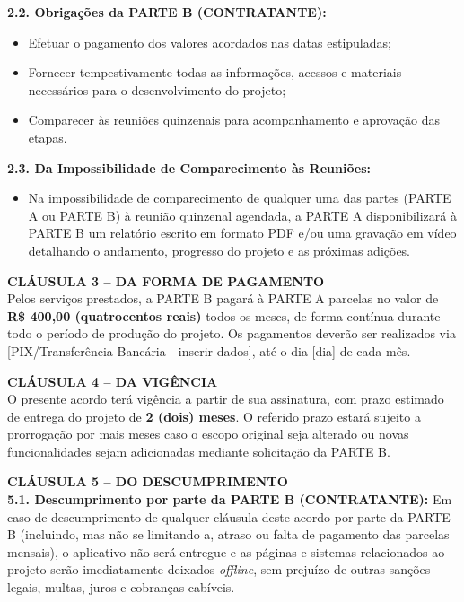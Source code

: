 \documentclass[12pt, a4paper]{article}
\begin{document}
\textbf{2.2. Obrigações da PARTE B (CONTRATANTE):}
\begin{itemize}
    \item Efetuar o pagamento dos valores acordados nas datas estipuladas;
    \item Fornecer tempestivamente todas as informações, acessos e materiais necessários para o desenvolvimento do projeto;
    \item Comparecer às reuniões quinzenais para acompanhamento e aprovação das etapas.
\end{itemize}

\textbf{2.3. Da Impossibilidade de Comparecimento às Reuniões:}
\begin{itemize}
    \item Na impossibilidade de comparecimento de qualquer uma das partes (PARTE A ou PARTE B) à reunião quinzenal agendada, a PARTE A disponibilizará à PARTE B um relatório escrito em formato PDF e/ou uma gravação em vídeo detalhando o andamento, progresso do projeto e as próximas adições.
\end{itemize}

\vspace{0.5cm}
\noindent\textbf{CLÁUSULA 3 -- DA FORMA DE PAGAMENTO} \\
Pelos serviços prestados, a PARTE B pagará à PARTE A parcelas no valor de \textbf{R\$ 400,00 (quatrocentos reais)} todos os meses, de forma contínua durante todo o período de produção do projeto. Os pagamentos deverão ser realizados via [PIX/Transferência Bancária - inserir dados], até o dia [dia] de cada mês.

\vspace{0.5cm}
\noindent\textbf{CLÁUSULA 4 -- DA VIGÊNCIA} \\
O presente acordo terá vigência a partir de sua assinatura, com prazo estimado de entrega do projeto de \textbf{2 (dois) meses}. O referido prazo estará sujeito a prorrogação por mais meses caso o escopo original seja alterado ou novas funcionalidades sejam adicionadas mediante solicitação da PARTE B.

\vspace{0.5cm}
\noindent\textbf{CLÁUSULA 5 -- DO DESCUMPRIMENTO} \\
\textbf{5.1. Descumprimento por parte da PARTE B (CONTRATANTE):} Em caso de descumprimento de qualquer cláusula deste acordo por parte da PARTE B (incluindo, mas não se limitando a, atraso ou falta de pagamento das parcelas mensais), o aplicativo não será entregue e as páginas e sistemas relacionados ao projeto serão imediatamente deixados \textit{offline}, sem prejuízo de outras sanções legais, multas, juros e cobranças cabíveis.
\end{document}
